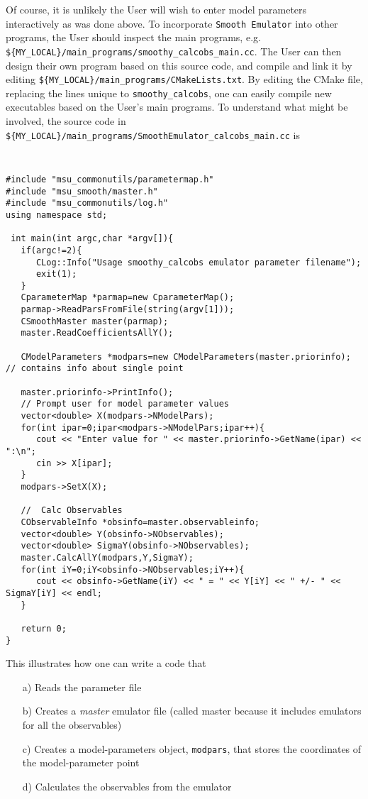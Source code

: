 \documentclass[UserManual.tex]{subfiles}
\begin{document}
Of course, it is unlikely the User will wish to enter model parameters interactively as was done above. To incorporate {\tt Smooth Emulator} into other programs, the User should inspect the main programs, e.g. {\tt \$\{MY\_LOCAL\}/main\_programs/smoothy\_calcobs\_main.cc}. The User can then design their own program based on this source code, and compile and link it by editing {\tt \$\{MY\_LOCAL\}/main\_programs/CMakeLists.txt}. By editing the CMake file, replacing the lines unique to {\tt smoothy\_calcobs}, one can easily compile new executables based on the User's main programs. To understand what might be involved, the source code in {\tt \$\{MY\_LOCAL\}/main\_programs/SmoothEmulator\_calcobs\_main.cc} is
{\tt
\begin{verbatim}
#include "msu_commonutils/parametermap.h"
#include "msu_smooth/master.h"
#include "msu_commonutils/log.h"
using namespace std;

 int main(int argc,char *argv[]){
   if(argc!=2){
      CLog::Info("Usage smoothy_calcobs emulator parameter filename");
      exit(1);
   }
   CparameterMap *parmap=new CparameterMap();
   parmap->ReadParsFromFile(string(argv[1]));
   CSmoothMaster master(parmap);
   master.ReadCoefficientsAllY();
   
   CModelParameters *modpars=new CModelParameters(master.priorinfo); // contains info about single point
   
   master.priorinfo->PrintInfo();
   // Prompt user for model parameter values
   vector<double> X(modpars->NModelPars);
   for(int ipar=0;ipar<modpars->NModelPars;ipar++){
      cout << "Enter value for " << master.priorinfo->GetName(ipar) << ":\n";
      cin >> X[ipar];
   }
   modpars->SetX(X);
   
   //  Calc Observables
   CObservableInfo *obsinfo=master.observableinfo;
   vector<double> Y(obsinfo->NObservables);
   vector<double> SigmaY(obsinfo->NObservables);
   master.CalcAllY(modpars,Y,SigmaY);
   for(int iY=0;iY<obsinfo->NObservables;iY++){
      cout << obsinfo->GetName(iY) << " = " << Y[iY] << " +/- " << SigmaY[iY] << endl;
   }

   return 0;
}
\end{verbatim}
}
This illustrates how one can write a code that 
\begin{itemize}\itemsep=0pt
\item[a)] Reads the parameter file
\item[b)] Creates a {\it master} emulator file (called master because it includes emulators for all the observables)
\item[c)] Creates a model-parameters object, {\tt modpars}, that stores the coordinates of the model-parameter point
\item[d)] Calculates the observables from the emulator
\end{itemize}
\end{document}
